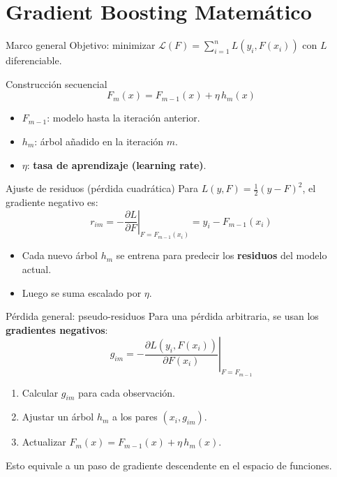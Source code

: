 \documentclass[aspectratio=169, 10pt, xcolor=table]{beamer}
\begin{document}
\section{Gradient Boosting Matemático}

\begin{frame}{Marco general}
    Objetivo: minimizar $\mathcal{L}(F) = \sum_{i=1}^n L(y_i, F(x_i))$ con $L$ diferenciable.
    \begin{block}{Construcción secuencial}
        \[
        F_m(x) = F_{m-1}(x) + \eta \, h_m(x)
        \]
        \begin{itemize}
            \item $F_{m-1}$: modelo hasta la iteración anterior.
            \item $h_m$: árbol añadido en la iteración $m$.
            \item $\eta$: \textbf{tasa de aprendizaje (learning rate)}.
        \end{itemize}
    \end{block}
\end{frame}

\begin{frame}{Ajuste de residuos (pérdida cuadrática)}
    Para $L(y,F) = \frac{1}{2}(y-F)^2$, el gradiente negativo es:
    \[
    r_{im} = -\left.\frac{\partial L}{\partial F}\right|_{F=F_{m-1}(x_i)} = y_i - F_{m-1}(x_i)
    \]
    \begin{itemize}
        \item Cada nuevo árbol $h_m$ se entrena para predecir los \textbf{residuos} del modelo actual.
        \item Luego se suma escalado por $\eta$.
    \end{itemize}
\end{frame}

\begin{frame}{Pérdida general: pseudo-residuos}
    Para una pérdida arbitraria, se usan los \textbf{gradientes negativos}:
    \[
    g_{im} = -\left.\frac{\partial L(y_i, F(x_i))}{\partial F(x_i)}\right|_{F=F_{m-1}}
    \]
    \begin{enumerate}
        \item Calcular $g_{im}$ para cada observación.
        \item Ajustar un árbol $h_m$ a los pares $(x_i, g_{im})$.
        \item Actualizar $F_m(x) = F_{m-1}(x) + \eta \, h_m(x)$.
    \end{enumerate}
    Esto equivale a un paso de gradiente descendente en el espacio de funciones.
\end{frame}
\end{document}
